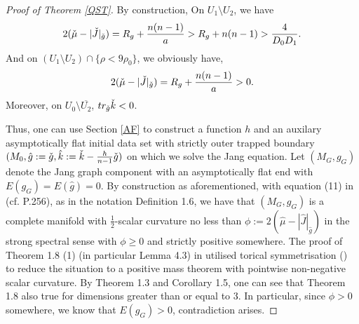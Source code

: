 \documentclass[11pt]{amsart}
\newcommand{\be}{\begin{equation}}
\newcommand{\ee}{\end{equation}}
\theoremstyle{remark}
\numberwithin{equation}{section}
\def\be{\begin{equation}}
\def\ee{\end{equation}}
\def\p{\partial}
\def\S{\Sigma}
\def\h {\hat}
\begin{document}
{{\begin{proof}[Proof of Theorem \ref{QST}]
By construction, On $U_1\setminus U_2$, we have 
\be 
2(\Check \mu- |\Check J|_{\Check g})= R_g+\frac{n(n-1)}{a}> R_g+n(n-1)>\frac{4}{D_0D_1}. 
\ee 
And on $(U_1\setminus U_2) \cap \{\rho<9\rho_0\} $,  we obviously have, 
\be 
2(\Check \mu- |\Check J|_{\Check g})= R_g+\frac{n(n-1)}{a}> 0.  
\ee 
Moreover, on $U_0\setminus \overline{U_2}$, $tr_{\Check g} \Check k <0$.  

Thus, one can use Section \ref{AF} to construct a function $h$ and an auxilary asymptotically flat initial data set with strictly outer trapped boundary $(M_0,\hat g:=\Check g,\hat k:=\Check k-\frac{h}{n-1}\Check g)$ on which we solve the Jang equation. Let $(M_{G}, g_{G})$ denote the Jang graph component with an asymptotically flat end with $E(g_{G})=E(\hat g)=0$.  By construction as aforementioned, with equation (11) in \cite{E3} (cf. \cite{SY2} P.256),  as in the notation \cite{HSY} Definition 1.6, we have that $(M_{G}, g_{G})$ is a complete manifold with $\frac{1}{2}$-scalar curvature no less than $\phi:=2(\hat\mu-|\hat J|_{\hat g})$ in the strong spectral sense with $\phi\geq 0$ and strictly positive somewhere.  The proof of Theorem 1.8 (1) (in particular Lemma 4.3) in \cite{HSY} utilised torical symmetrisation (\cite{FCS80, SY7}) to reduce the situation to a positive mass theorem with pointwise non-negative scalar curvature. By \cite{LLU22} Theorem 1.3 and \cite{BW1} Corollary 1.5, one can see that \cite{HSY} Theorem 1.8 also true for dimensions greater than or equal to 3.  In particular,  since $\phi>0$ somewhere, we know that $E(g_{G})>0$, contradiction arises. 

\end{proof}

}}
\end{document}
